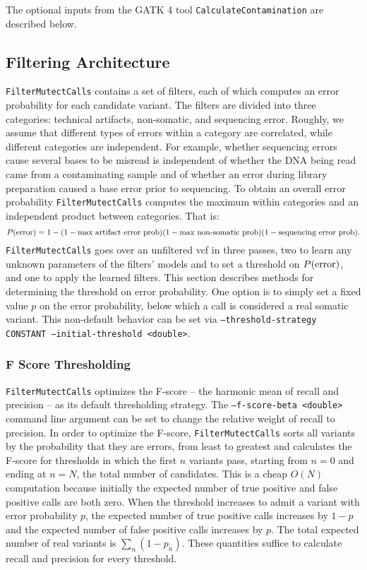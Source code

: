 \documentclass[nofootinbib,amssymb,amsmath]{revtex4}
\newcommand{\code}[1]{\texttt{#1}}
\begin{document}
The optional inputs from the GATK 4 tool \code{CalculateContamination} are described below.

\subsection{Filtering Architecture}
\code{FilterMutectCalls} contains a set of filters, each of which computes an error probability for each candidate variant.  The filters are divided into three categories: technical artifacts, non-somatic, and sequencing error.  Roughly, we assume that different types of errors within a category are correlated, while different categories are independent.  For example, whether sequencing errors cause several bases to be misread is independent of whether the DNA being read came from a contaminating sample and of whether an error during library preparation caused a base error prior to sequencing.  To obtain an overall error probability \code{FilterMutectCalls} computes the maximum within categories and an independent product between categories.  That is:
\begin{equation}
P({\rm error}) = 1 - (1 - \textrm{max artifact error prob})(1 - \textrm{max non-somatic prob})(1 - \textrm{sequencing error prob}).
\end{equation}
\code{FilterMutectCalls} goes over an unfiltered vcf in three passes, two to learn any unknown parameters of the filters' models and to set a threshold on $P({\rm error})$, and one to apply the learned filters.  This section describes methods for determining the threshold on error probability.  One option is to simply set a fixed value $p$ on the error probability, below which a call is considered a real somatic variant.  This non-default behavior can be set via \code{--threshold-strategy CONSTANT --initial-threshold <double>}.

\subsubsection{F Score Thresholding}
\code{FilterMutectCalls} optimizes the F-score -- the harmonic mean of recall and precision -- as its default thresholding strategy.  The \code{--f-score-beta <double>} command line argument can be set to change the relative weight of recall to precision.  In order to optimize the F-score, \code{FilterMutectCalls} sorts all variants by the probability that they are errors, from least to greatest and calculates the F-score for thresholds in which the first $n$ variants pass, starting from $n = 0$ and ending at $n = N$, the total number of candidates.  This is a cheap $O(N)$ computation because initially the expected number of true positive and false positive calls are both zero.  When the threshold increases to admit a variant with error probability $p$, the expected number of true positive calls increases by $1 - p$ and the expected number of false positive calls increases by $p$.  The total expected number of real variants is $\sum_n (1 - p_n)$.  These quantities suffice to calculate recall and precision for every threshold.
\end{document}

